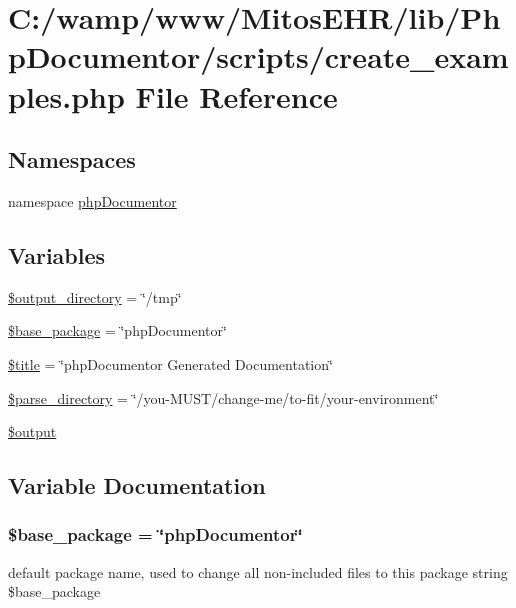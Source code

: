 \hypertarget{create__examples_8php}{\section{\-C\-:/wamp/www/\-Mitos\-E\-H\-R/lib/\-Php\-Documentor/scripts/create\-\_\-examples.php \-File \-Reference}
\label{create__examples_8php}
}
\subsection*{\-Namespaces}
\begin{DoxyCompactItemize}
\item 
namespace \hyperlink{namespacephp_documentor}{php\-Documentor}
\end{DoxyCompactItemize}
\subsection*{\-Variables}
\begin{DoxyCompactItemize}
\item 
\hyperlink{create__examples_8php_a5e916e660f7c9bbaeccf19c383d096bf}{\$output\-\_\-directory} = \char`\"{}/tmp\char`\"{}
\item 
\hyperlink{create__examples_8php_a50ddcd788a6a834e953c8733673c7556}{\$base\-\_\-package} = \char`\"{}php\-Documentor\char`\"{}
\item 
\hyperlink{create__examples_8php_ada57e7bb7c152edad18fe2f166188691}{\$title} = \char`\"{}php\-Documentor \-Generated \-Documentation\char`\"{}
\item 
\hyperlink{create__examples_8php_aade4270e4afac352f045c8f898357c8f}{\$parse\-\_\-directory} = \char`\"{}/you-\/\-M\-U\-S\-T/change-\/me/to-\/fit/your-\/environment\char`\"{}
\item 
\hyperlink{create__examples_8php_a73004ce9cd673c1bfafd1dc351134797}{\$output}
\end{DoxyCompactItemize}


\subsection{\-Variable \-Documentation}
\hypertarget{create__examples_8php_a50ddcd788a6a834e953c8733673c7556}{
\subsubsection[{\$base\-\_\-package}]{\setlength{\rightskip}{0pt plus 5cm}\$base\-\_\-package = \char`\"{}php\-Documentor\char`\"{}}}\label{create__examples_8php_a50ddcd788a6a834e953c8733673c7556}
default package name, used to change all non-\/included files to this package  string \$base\-\_\-package 


